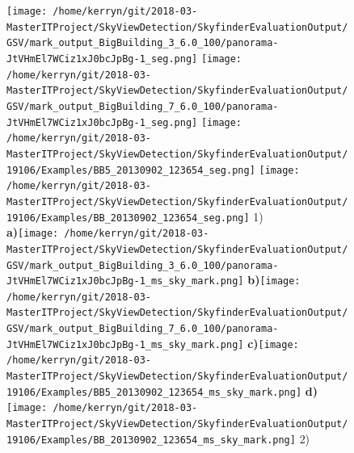 \documentclass{article}
\begin{document}
\clearpage
\begin{figure}
\centering    
\textbf{}\texttt{[image: /home/kerryn/git/2018-03-MasterITProject/SkyViewDetection/SkyfinderEvaluationOutput/GSV/mark\_output\_BigBuilding\_3\_6.0\_100/panorama-JtVHmEl7WCiz1xJ0bcJpBg-1\_seg.png]} 
\textbf{}\texttt{[image: /home/kerryn/git/2018-03-MasterITProject/SkyViewDetection/SkyfinderEvaluationOutput/GSV/mark\_output\_BigBuilding\_7\_6.0\_100/panorama-JtVHmEl7WCiz1xJ0bcJpBg-1\_seg.png]} 
\textbf{}\texttt{[image: /home/kerryn/git/2018-03-MasterITProject/SkyViewDetection/SkyfinderEvaluationOutput/19106/Examples/BB5\_20130902\_123654\_seg.png]} 
\textbf{}\texttt{[image: /home/kerryn/git/2018-03-MasterITProject/SkyViewDetection/SkyfinderEvaluationOutput/19106/Examples/BB\_20130902\_123654\_seg.png]} \scriptsize{1)}
\\
\textbf{\scriptsize{a)}}\texttt{[image: /home/kerryn/git/2018-03-MasterITProject/SkyViewDetection/SkyfinderEvaluationOutput/GSV/mark\_output\_BigBuilding\_3\_6.0\_100/panorama-JtVHmEl7WCiz1xJ0bcJpBg-1\_ms\_sky\_mark.png]} 
\textbf{\scriptsize{b)}}\texttt{[image: /home/kerryn/git/2018-03-MasterITProject/SkyViewDetection/SkyfinderEvaluationOutput/GSV/mark\_output\_BigBuilding\_7\_6.0\_100/panorama-JtVHmEl7WCiz1xJ0bcJpBg-1\_ms\_sky\_mark.png]} 
\textbf{\scriptsize{c)}}\texttt{[image: /home/kerryn/git/2018-03-MasterITProject/SkyViewDetection/SkyfinderEvaluationOutput/19106/Examples/BB5\_20130902\_123654\_ms\_sky\_mark.png]} 
\textbf{\scriptsize{d)}}\texttt{[image: /home/kerryn/git/2018-03-MasterITProject/SkyViewDetection/SkyfinderEvaluationOutput/19106/Examples/BB\_20130902\_123654\_ms\_sky\_mark.png]} \scriptsize{2)}
\end{figure} 
\end{document}

